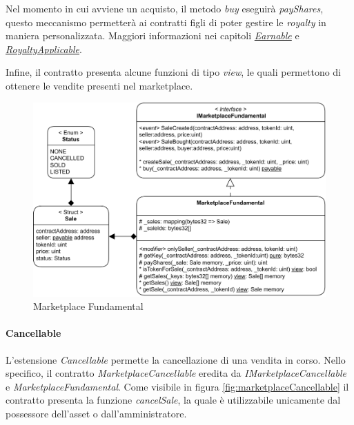 Nel momento in cui avviene un acquisto, il metodo \textit{buy} eseguirà \textit{payShares}, questo meccanismo permetterà ai contratti figli di poter gestire le \textit{royalty} in maniera personalizzata. Maggiori informazioni nei capitoli \hyperref[sec:marketplace-earnable]{\textit{Earnable}} e \hyperref[sec:marketplace-royalty-applicable]{\textit{RoyaltyApplicable}}.

Infine, il contratto presenta alcune funzioni di tipo \textit{view}, le quali permettono di ottenere le vendite presenti nel marketplace.

\begin{figure}[H]
    \centering
    \includegraphics[width=1\textwidth]{images/blockchainContracts/MarketplaceFundamental.png}
    \caption{Marketplace Fundamental}
    \label{fig:marketplaceFundamental}
\end{figure}



\paragraph{Cancellable}
L'estensione \textit{Cancellable} permette la cancellazione di una vendita in corso. Nello specifico, il contratto \textit{MarketplaceCancellable} eredita da \textit{IMarketplaceCancellable} e \textit{MarketplaceFundamental}. Come visibile in figura \ref{fig:marketplaceCancellable} il contratto presenta la funzione \textit{cancelSale}, la quale è utilizzabile unicamente dal possessore dell'asset o dall'amministratore.


